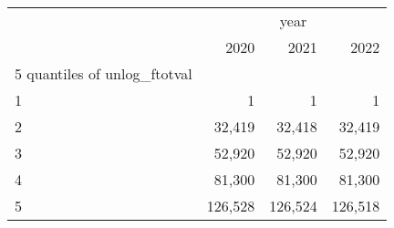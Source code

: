 \begin{tabular}{llll}
\cline{1-4}
\multicolumn{1}{c}{} &
  \multicolumn{3}{|c}{year} \\
\multicolumn{1}{c}{} &
  \multicolumn{1}{|r}{2020} &
  \multicolumn{1}{r}{2021} &
  \multicolumn{1}{r}{2022} \\
\cline{1-4}
\multicolumn{1}{l}{5 quantiles of unlog\_ftotval} &
  \multicolumn{1}{|r}{} &
  \multicolumn{1}{r}{} &
  \multicolumn{1}{r}{} \\
\multicolumn{1}{l}{\hspace{1em}1} &
  \multicolumn{1}{|r}{1} &
  \multicolumn{1}{r}{1} &
  \multicolumn{1}{r}{1} \\
\multicolumn{1}{l}{\hspace{1em}2} &
  \multicolumn{1}{|r}{32,419} &
  \multicolumn{1}{r}{32,418} &
  \multicolumn{1}{r}{32,419} \\
\multicolumn{1}{l}{\hspace{1em}3} &
  \multicolumn{1}{|r}{52,920} &
  \multicolumn{1}{r}{52,920} &
  \multicolumn{1}{r}{52,920} \\
\multicolumn{1}{l}{\hspace{1em}4} &
  \multicolumn{1}{|r}{81,300} &
  \multicolumn{1}{r}{81,300} &
  \multicolumn{1}{r}{81,300} \\
\multicolumn{1}{l}{\hspace{1em}5} &
  \multicolumn{1}{|r}{126,528} &
  \multicolumn{1}{r}{126,524} &
  \multicolumn{1}{r}{126,518} \\
\cline{1-4}
\end{tabular}
